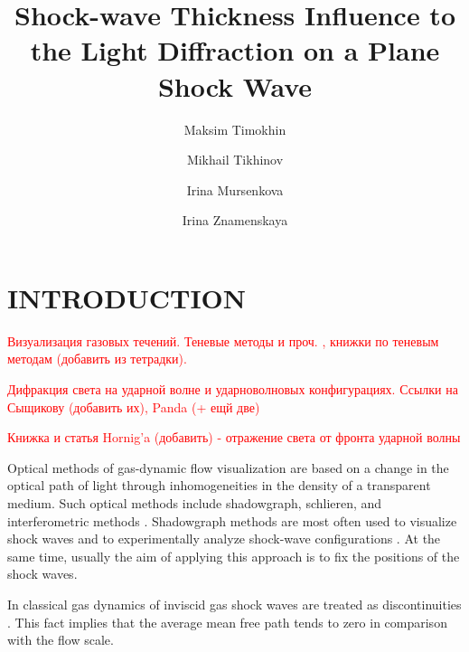 \documentclass{aip-cp}
\begin{document}
\title{Shock-wave Thickness Influence to the Light Diffraction on a Plane Shock Wave}

\author[aff1,aff2]{Maksim Timokhin}
\author[aff1]{Mikhail Tikhinov}
\author[aff1]{Irina Mursenkova}
\author[aff1]{Irina Znamenskaya}


\maketitle


\begin{abstract}

\end{abstract}

\section{INTRODUCTION}

\textcolor{red}{Визуализация газовых течений. Теневые методы и проч. , книжки по теневым методам (добавить из тетрадки).}

\textcolor{red}{Дифракция света на ударной волне и ударноволновых конфигурациях. Ссылки на Сыщикову (добавить их), Panda \cite{Panda_1995} (+ ещй две)}

\textcolor{red}{Книжка и статья Hornig'a (добавить) - отражение света от фронта ударной волны}

Optical methods of gas-dynamic flow visualization are based on a change in the optical path of light through inhomogeneities in the density of a transparent medium. Such optical methods include shadowgraph, schlieren, and interferometric methods \cite{}. Shadowgraph methods are most often used to visualize shock waves and to experimentally analyze shock-wave configurations \cite{}. At the same time, usually the aim of applying this approach is to fix the positions of the shock waves. 

In classical gas dynamics of inviscid gas shock waves are treated as discontinuities \citep{Sedov,LANDAU1987}. This fact implies that the average mean free path tends to zero in comparison with the flow scale. 
\end{document}
